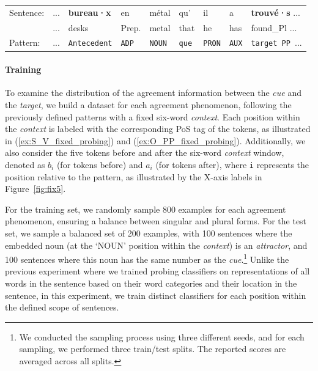 \begin{exe}
\ex \label{ex:O_PP_fixed_probing}
\begin{tabular}{lllllllll}
   Sentence: & ... & \textbf{bureau·x} & en & métal & qu' & il & a & \textbf{trouvé·s } ... \\
   & ... & {\scriptsize desks} & {\scriptsize Prep.} & {\scriptsize metal} & {\scriptsize that} & {\scriptsize he} & {\scriptsize has} & {\scriptsize found\_Pl } ... \\
   Pattern: & ... & \texttt{Antecedent} & \texttt{ADP} & \texttt{NOUN} & \texttt{que} & \texttt{PRON} & \texttt{AUX} & \texttt{target PP }...
\end{tabular}
\end{exe}

\paragraph{Training} To examine the distribution of the agreement information between the \emph{cue} and the \emph{target}, we build a dataset for each agreement phenomenon, following the previously defined patterns with a fixed six-word \emph{context}. Each position within the \emph{context} is labeled with the corresponding PoS tag of the tokens, as illustrated in (\ref{ex:S_V_fixed_probing}) and (\ref{ex:O_PP_fixed_probing}). Additionally, we also consider the five tokens before and after the six-word \emph{context} window, denoted as \texttt{$b_i$} (for tokens before) and \texttt{$a_i$} (for tokens after), where \texttt{i} represents the position relative to the pattern, as illustrated by the X-axis labels in Figure~\ref{fig:fix5}.


For the training set, we randomly sample 800 examples for each agreement phenomenon, ensuring a balance between singular and plural forms. For the test set, we sample a balanced set of 200
examples, with 100 sentences where the embedded noun (at the `NOUN' position within the \emph{context}) is an \emph{attractor}, and 100 sentences where this noun has the same number as the \emph{cue}.\footnote{We conducted the sampling process using three different seeds, and for each sampling, we performed three train/test splits. The reported scores are averaged across all splits.} Unlike the previous experiment where we trained probing classifiers on representations of all words in the sentence based on their word categories and their location in the sentence, in this experiment, we train distinct classifiers for each position within the defined scope of sentences.

